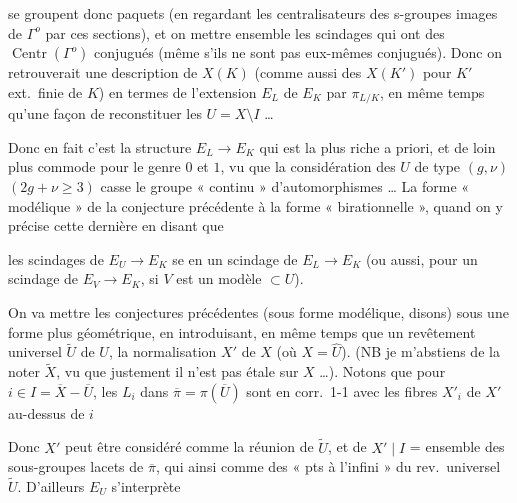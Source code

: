\documentclass[11pt,a4paper]{article}
\begin{document}
se groupent donc \struck{\ill{}}  paquets (en regardant les
centralisateurs des s-groupes images de $\Gamma^{o}$ par ces sections), et on
\ill{} mettre ensemble les scindages qui ont des
$\operatorname{Centr}(\Gamma^{o})$ conjugués (même s'ils ne sont pas eux-mêmes
conjugués). Donc on retrouverait une description de $X(K)$ (comme aussi des
$X(K')$ pour $K'$ ext.\ finie de $K$) en termes de l'extension $E_L$ de $E_K$ par
$\pi_{L/K}$, en même temps qu'une façon de reconstituer les $U = X \setminus I$ …

Donc en fait c'est la structure $E_L \to E_K$ qui est la plus riche a priori, et
de loin plus commode pour le genre $0$ et $1$, vu que la considération des $U$ de
type $(g,\nu)$ $(2g+\nu \geq 3)$ casse le groupe « continu »
d'automorphismes … La forme « modélique » de la conjecture précédente
 à la forme « birationnelle », quand on y précise cette
dernière en disant que

les scindages de $E_U \to E_K$ se \struck{\ill{}}  en un
scindage de $E_L \to E_K$ (ou aussi, pour un scindage de $E_V \to E_K$, si $V$
est un modèle $\subset U$).

On va mettre les conjectures précédentes (sous forme modélique, disons) sous une
forme plus géométrique, en introduisant, en même temps que un revêtement
universel $\widetilde{U}$ de $U$, la normalisation $X'$ \add{\ill{}} de $X$
 (où $X = \widehat{U}$). (NB je m'abstiens de la noter
$\widetilde{X}$, vu que justement il n'est pas étale sur $X$ …). Notons que pour
 $i \in I = \overline{X} - \overline{U}$, les $L_i$ dans
$\overline{\pi} = \pi(\overline{U})$ sont en corr.\ 1-1 avec  les
fibres $X'_i$ de $X'$ au-dessus de $i$


Donc $X'$ peut être considéré comme la réunion de $\widetilde{U}$, et de
$X' \mid I$ = ensemble des sous-groupes lacets de $\overline{\pi}$, qui
 ainsi comme des « pts à l'infini » du rev.\ universel
$\widetilde{U}$. D'ailleurs $E_U$ s'interprète
\end{document}

